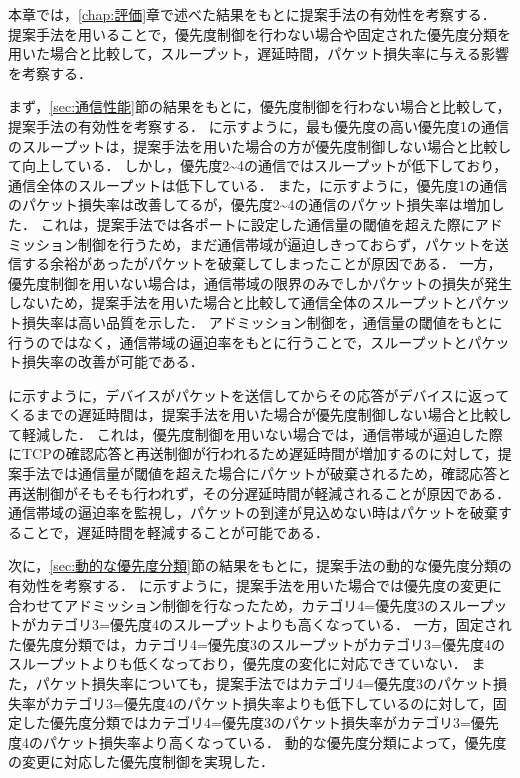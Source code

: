\documentclass[a4paper,11pt,uplatex]{ujreport}
\begin{document}
  本章では，\ref{chap:評価}章で述べた結果をもとに提案手法の有効性を考察する．
  提案手法を用いることで，優先度制御を行わない場合や固定された優先度分類を用いた場合と比較して，スループット，遅延時間，パケット損失率に与える影響を考察する．\par

  まず，\ref{sec:通信性能}節の結果をもとに，優先度制御を行わない場合と比較して，提案手法の有効性を考察する．
  に示すように，最も優先度の高い優先度1の通信のスループットは，提案手法を用いた場合の方が優先度制御しない場合と比較して向上している．
  しかし，優先度2\textasciitilde4の通信ではスループットが低下しており，通信全体のスループットは低下している．
  また，に示すように，優先度1の通信のパケット損失率は改善してるが，優先度2\textasciitilde4の通信のパケット損失率は増加した．
  これは，提案手法では各ポートに設定した通信量の閾値を超えた際にアドミッション制御を行うため，まだ通信帯域が逼迫しきっておらず，パケットを送信する余裕があったがパケットを破棄してしまったことが原因である．
  一方，優先度制御を用いない場合は，通信帯域の限界のみでしかパケットの損失が発生しないため，提案手法を用いた場合と比較して通信全体のスループットとパケット損失率は高い品質を示した．
  アドミッション制御を，通信量の閾値をもとに行うのではなく，通信帯域の逼迫率をもとに行うことで，スループットとパケット損失率の改善が可能である．\par

  に示すように，デバイスがパケットを送信してからその応答がデバイスに返ってくるまでの遅延時間は，提案手法を用いた場合が優先度制御しない場合と比較して軽減した．
  これは，優先度制御を用いない場合では，通信帯域が逼迫した際にTCPの確認応答と再送制御が行われるため遅延時間が増加するのに対して，提案手法では通信量が閾値を超えた場合にパケットが破棄されるため，確認応答と再送制御がそもそも行われず，その分遅延時間が軽減されることが原因である．
  通信帯域の逼迫率を監視し，パケットの到達が見込めない時はパケットを破棄することで，遅延時間を軽減することが可能である．\par

  次に，\ref{sec:動的な優先度分類}節の結果をもとに，提案手法の動的な優先度分類の有効性を考察する．
  に示すように，提案手法を用いた場合では優先度の変更に合わせてアドミッション制御を行なったため，カテゴリ4=優先度3のスループットがカテゴリ3=優先度4のスループットよりも高くなっている．
  一方，固定された優先度分類では，カテゴリ4=優先度3のスループットがカテゴリ3=優先度4のスループットよりも低くなっており，優先度の変化に対応できていない．
  また，パケット損失率についても，提案手法ではカテゴリ4=優先度3のパケット損失率がカテゴリ3=優先度4のパケット損失率よりも低下しているのに対して，固定した優先度分類ではカテゴリ4=優先度3のパケット損失率がカテゴリ3=優先度4のパケット損失率より高くなっている．
  動的な優先度分類によって，優先度の変更に対応した優先度制御を実現した．\par
\end{document}
